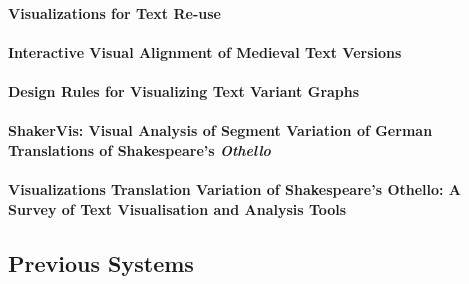 \paragraph{Visualizations for Text Re-use}

\paragraph[]{}

\paragraph{Interactive Visual Alignment of Medieval Text Versions}

\paragraph[]{}

\paragraph{Design Rules for Visualizing Text Variant Graphs}

\paragraph[]{}

\paragraph{ShakerVis: Visual Analysis of Segment Variation of German Translations of Shakespeare’s \emph{Othello}}

\paragraph[]{}

\paragraph{Visualizations Translation Variation of Shakespeare's Othello: A Survey of Text Visualisation and Analysis Tools}

\paragraph[]{}

\subsection{Previous Systems}

